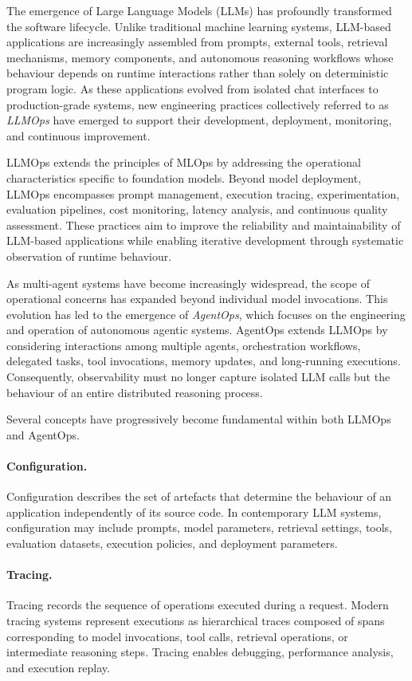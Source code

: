 \documentclass[10pt]{article}
\begin{document}
The emergence of Large Language Models (LLMs) has profoundly transformed the software lifecycle. Unlike traditional machine learning systems, LLM-based applications are increasingly assembled from prompts, external tools, retrieval mechanisms, memory components, and autonomous reasoning workflows whose behaviour depends on runtime interactions rather than solely on deterministic program logic. As these applications evolved from isolated chat interfaces to production-grade systems, new engineering practices collectively referred to as \emph{LLMOps} have emerged to support their development, deployment, monitoring, and continuous improvement.

LLMOps extends the principles of MLOps by addressing the operational characteristics specific to foundation models. Beyond model deployment, LLMOps encompasses prompt management, execution tracing, experimentation, evaluation pipelines, cost monitoring, latency analysis, and continuous quality assessment. These practices aim to improve the reliability and maintainability of LLM-based applications while enabling iterative development through systematic observation of runtime behaviour.

As multi-agent systems have become increasingly widespread, the scope of operational concerns has expanded beyond individual model invocations. This evolution has led to the emergence of \emph{AgentOps}, which focuses on the engineering and operation of autonomous agentic systems. AgentOps extends LLMOps by considering interactions among multiple agents, orchestration workflows, delegated tasks, tool invocations, memory updates, and long-running executions. Consequently, observability must no longer capture isolated LLM calls but the behaviour of an entire distributed reasoning process.

Several concepts have progressively become fundamental within both LLMOps and AgentOps.

\paragraph{Configuration.}
Configuration describes the set of artefacts that determine the behaviour of an application independently of its source code. In contemporary LLM systems, configuration may include prompts, model parameters, retrieval settings, tools, evaluation datasets, execution policies, and deployment parameters.

\paragraph{Tracing.}
Tracing records the sequence of operations executed during a request. Modern tracing systems represent executions as hierarchical traces composed of spans corresponding to model invocations, tool calls, retrieval operations, or intermediate reasoning steps. Tracing enables debugging, performance analysis, and execution replay.
\end{document}
